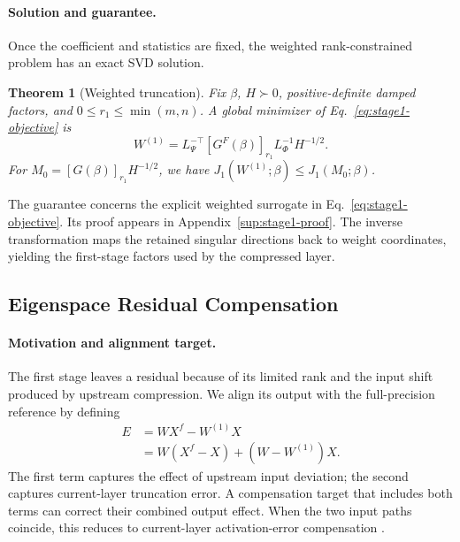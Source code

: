 \documentclass[11pt]{article}
\newtheorem{theorem}{Theorem}
\begin{document}
\paragraph{Solution and guarantee.}
Once the coefficient and statistics are fixed, the weighted rank-constrained problem has an exact SVD solution.
\begin{theorem}[Weighted truncation]\label{thm:fisher}
Fix $\beta$, $H\succ0$, positive-definite damped factors, and $0\le r_1\le\min(m,n)$. A global minimizer of Eq.~\eqref{eq:stage1-objective} is
\begin{equation}
W^{(1)}=L_\Psi^{-\top}[G^F(\beta)]_{r_1}
L_\Phi^{-1}H^{-1/2}.
\label{eq:stage1-output}
\end{equation}
For $M_0=[G(\beta)]_{r_1}H^{-1/2}$, we have $J_1(W^{(1)};\beta)\le J_1(M_0;\beta)$.
\end{theorem}
The guarantee concerns the explicit weighted surrogate in Eq.~\eqref{eq:stage1-objective}. Its proof appears in Appendix~\ref{sup:stage1-proof}. The inverse transformation maps the retained singular directions back to weight coordinates, yielding the first-stage factors used by the compressed layer.

\subsection{Eigenspace Residual Compensation}\label{sec:eigenspace-comp}

\paragraph{Motivation and alignment target.}
The first stage leaves a residual because of its limited rank and the input shift produced by upstream compression. We align its output with the full-precision reference by defining
\begin{equation}
\begin{aligned}
E&=WX^f-W^{(1)}X\\
 &=W(X^f-X)+(W-W^{(1)})X.
\end{aligned}
\label{eq:global-alignment-error}
\end{equation}
The first term captures the effect of upstream input deviation; the second captures current-layer truncation error. A compensation target that includes both terms can correct their combined output effect. When the two input paths coincide, this reduces to current-layer activation-error compensation \citep{liu2025eora}.
\end{document}
